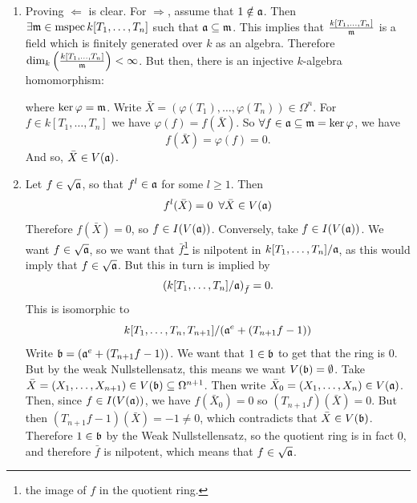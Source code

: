 \documentclass{article}
\begin{document}
\proof \hspace{0.1cm}
\begin{enumerate}
    \item[1.] Proving $\Leftarrow$ is clear. For $\Rightarrow$, assume that $1 \notin \mathfrak{a}$. Then $\exists \mathfrak{m} \in \operatorname{mspec} k[T_{1}, \dots, T_{n}]$ such that $\mathfrak{a} \subseteq \mathfrak{m}$. \gap This implies that $\frac{k[T_{1},\dots, T_{n}]}{\mathfrak{m}}$ is a field which is finitely generated over $k$ as an algebra. Therefore $\dim_{k} \left( \frac{k[T_{1}, \dots, T_{n}]}{\mathfrak{m}} \right) < \infty$. \gap But then, there is an injective $k$-algebra homomorphism: \begin{center}
    \end{center}
    where $\ker \varphi = \mathfrak{m}$. Write $\bar X = (\varphi(T_{1}), \dots, \varphi(T_{n})) \in \Omega^{n}$. For $f \in k[T_{1}, \dots, T_{n}]$ we have $\varphi(f) = f(\bar X)$. So $\forall f \in \mathfrak{a} \subseteq \mathfrak{m} = \ker \varphi$, we have \[ f(\bar X) = \varphi(f) = 0.\] And so, $\bar X \in V(\mathfrak{a})$.
    \item[2.] Let $f \in \sqrt{\mathfrak{a}}$, so that $f^{l} \in \mathfrak{a}$ for some $l \geq 1$. Then \[ f^{l}(\bar X) = 0 \,\,\, \forall \bar X \in V(\mathfrak{a})\] Therefore $f(\bar X) =0$, so $f \in I(V(\mathfrak{a}))$.\gap 
    Conversely, take $f \in I(V(\mathfrak{a}))$. We want $f \in \sqrt{\mathfrak{a}}$, so we want that $\bar f$\footnote{the image of $f$ in the quotient ring.} is nilpotent in $k[T_{1}, \dots, T_{n}] / \mathfrak{a}$, as this would imply that $f \in \sqrt{\mathfrak{a}}$. But this in turn is implied by \[ \left( k[T_{1},\dots, T_{n}]/\mathfrak{a}\right)_{\bar f} = 0.\]
    This is isomorphic to \[ k[T_{1}, \dots, T_{n}, T_{n+1}]/(\mathfrak{a}^{e} + (T_{n+1}f - 1))\] 
    Write $\mathfrak{b} = (\mathfrak{a}^{e} + (T_{n+1}f-1))$. We want that $1 \in \mathfrak{b}$ to get that the ring is $0$. But by the weak Nullstellensatz, this means we want $V(\mathfrak{b}) = \emptyset$.\gap 
    Take $\bar X = (X_{1}, \dots, X_{n+1}) \in V(\mathfrak{b}) \subseteq \Omega^{n+1}$. Then write $\bar X_{0} = (X_{1}, \dots, X_{n}) \in V(\mathfrak{a})$. Then, since $f \in I(V(\mathfrak{a}))$, we have $f(\bar X_{0}) = 0$ so $\left(T_{n+1}f\right)(\bar X) = 0$. But then $\left(T_{n+1}f -1\right)(\bar X) = -1 \neq 0$, which contradicts that $\bar X \in V(\mathfrak{b})$. Therefore $1 \in \mathfrak{b}$ by the Weak Nullstellensatz, so the quotient ring is in fact $0$, and therefore $\bar f$ is nilpotent, which means that $f \in \sqrt{\mathfrak{a}}$.
\end{enumerate}
\end{document}
